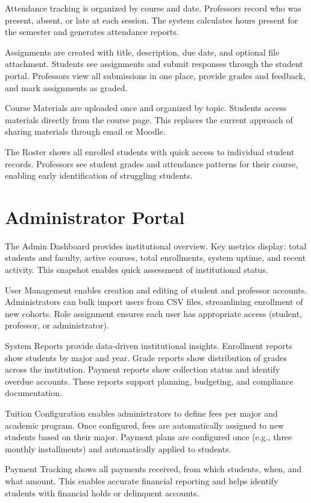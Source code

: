 \documentclass[12pt,a4paper]{report}
\begin{document}
Attendance tracking is organized by course and date. Professors record who was present, absent, or late at each session. The system calculates hours present for the semester and generates attendance reports.

Assignments are created with title, description, due date, and optional file attachment. Students see assignments and submit responses through the student portal. Professors view all submissions in one place, provide grades and feedback, and mark assignments as graded.

Course Materials are uploaded once and organized by topic. Students access materials directly from the course page. This replaces the current approach of sharing materials through email or Moodle.

The Roster shows all enrolled students with quick access to individual student records. Professors see student grades and attendance patterns for their course, enabling early identification of struggling students.

\section{Administrator Portal}

The Admin Dashboard provides institutional overview. Key metrics display: total students and faculty, active courses, total enrollments, system uptime, and recent activity. This snapshot enables quick assessment of institutional status.

User Management enables creation and editing of student and professor accounts. Administrators can bulk import users from CSV files, streamlining enrollment of new cohorts. Role assignment ensures each user has appropriate access (student, professor, or administrator).

System Reports provide data-driven institutional insights. Enrollment reports show students by major and year. Grade reports show distribution of grades across the institution. Payment reports show collection status and identify overdue accounts. These reports support planning, budgeting, and compliance documentation.

Tuition Configuration enables administrators to define fees per major and academic program. Once configured, fees are automatically assigned to new students based on their major. Payment plans are configured once (e.g., three monthly installments) and automatically applied to students.

Payment Tracking shows all payments received, from which students, when, and what amount. This enables accurate financial reporting and helps identify students with financial holds or delinquent accounts.
\end{document}
